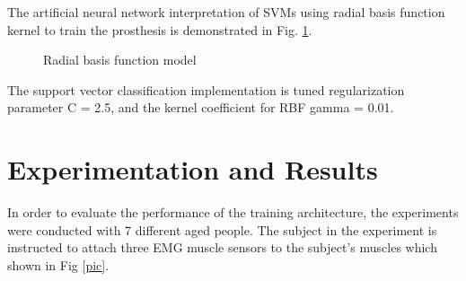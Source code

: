 \documentclass[conference]{IEEEtran}
\begin{document}
The artificial neural network interpretation of SVMs using radial basis function kernel to train the prosthesis is demonstrated in Fig. \ref{RBF}.

\begin{figure}[htp]
\centering
{}
\caption{Radial basis function model}
\label{RBF}

\end{figure}

The support vector classification implementation is tuned regularization parameter C = 2.5, and the kernel coefficient for RBF gamma = 0.01.




\section{Experimentation and Results}
In order to evaluate the performance of the training architecture, the experiments were conducted with 7 different aged people. The subject in the experiment is instructed to attach three EMG muscle sensors to the subject's muscles which shown in Fig \ref{pic}.
\end{document}
